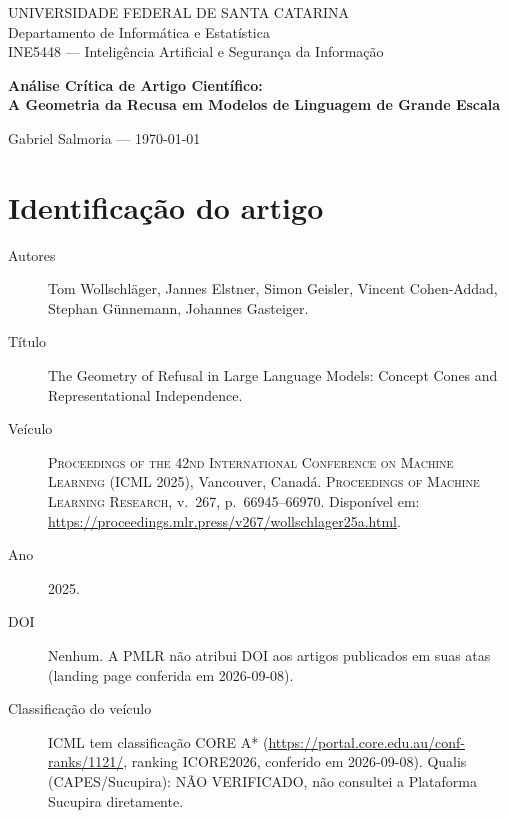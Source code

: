 \documentclass[article,11pt,oneside,a4paper,brazil,section=TITLE]{setup/abntex2}
\begin{document}
\textual

\begin{center}
  {\small
    UNIVERSIDADE FEDERAL DE SANTA CATARINA\\
    Departamento de Informática e Estatística\\
    INE5448 --- Inteligência Artificial e Segurança da Informação\par}
  \vspace{1.2em}
  {\bfseries\large Análise Crítica de Artigo Científico:\\
   A Geometria da Recusa em Modelos de Linguagem de Grande Escala\par}
  \vspace{0.8em}
  {Gabriel Salmoria \quad --- \quad \today\par}
\end{center}
\vspace{1em}

\section{Identificação do artigo}
\label{sec:identificacao}

\begin{description}
  \item[Autores] Tom Wollschläger, Jannes Elstner, Simon Geisler, Vincent
    Cohen-Addad, Stephan Günnemann, Johannes Gasteiger.
  \item[Título] The Geometry of Refusal in Large Language Models: Concept
    Cones and Representational Independence.
  \item[Veículo] \textsc{Proceedings of the 42nd International Conference
    on Machine Learning} (ICML 2025), Vancouver, Canadá.
    \textsc{Proceedings of Machine Learning Research}, v.~267,
    p.~66945--66970. Disponível em:
    \url{https://proceedings.mlr.press/v267/wollschlager25a.html}.
  \item[Ano] 2025.
  \item[DOI] Nenhum. A PMLR não atribui DOI aos artigos publicados em suas
    atas (landing page conferida em 2026-09-08).
  \item[Classificação do veículo] ICML tem classificação CORE A* (\url{https://portal.core.edu.au/conf-ranks/1121/}, ranking ICORE2026, conferido em 2026-09-08). Qualis (CAPES/Sucupira): NÃO VERIFICADO, não consultei a Plataforma Sucupira diretamente.
\end{description}
\end{document}
